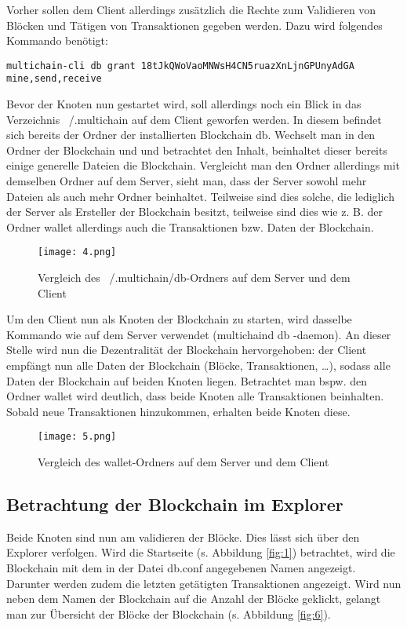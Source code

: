 Vorher sollen dem Client allerdings zusätzlich die Rechte zum Validieren von Blöcken und Tätigen von Transaktionen gegeben werden. Dazu wird folgendes Kommando benötigt:

\begin{lstlisting}[frame=single]
multichain-cli db grant 18tJkQWoVaoMNWsH4CN5ruazXnLjnGPUnyAdGA mine,send,receive
\end{lstlisting} 

Bevor der Knoten nun gestartet wird, soll allerdings noch ein Blick in das Verzeichnis ~/.multichain auf dem Client geworfen werden. In diesem befindet sich bereits der Ordner der installierten Blockchain db. Wechselt man in den Ordner der Blockchain und und betrachtet den Inhalt, beinhaltet dieser bereits einige generelle Dateien die Blockchain. Vergleicht man den Ordner allerdings mit demselben Ordner auf dem Server, sieht man, dass der Server sowohl mehr Dateien als auch mehr Ordner beinhaltet. Teilweise sind dies solche, die lediglich der Server als Ersteller der Blockchain besitzt, teilweise sind dies wie z. B. der Ordner wallet allerdings auch die Transaktionen bzw. Daten der Blockchain. 

\begin{figure}[h]
	\texttt{[image: 4.png]}
	\caption{Vergleich des ~/.multichain/db-Ordners auf dem Server und dem Client}
	\label{fig:4}
\end{figure}

Um den Client nun als Knoten der Blockchain zu starten, wird dasselbe Kommando wie auf dem Server verwendet (multichaind db -daemon). An dieser Stelle wird nun die Dezentralität der Blockchain hervorgehoben: der Client empfängt nun alle Daten der Blockchain (Blöcke, Transaktionen, …), sodass alle Daten der Blockchain auf beiden Knoten liegen. Betrachtet man bspw. den Ordner wallet wird deutlich, dass beide Knoten alle Transaktionen beinhalten. Sobald neue Transaktionen hinzukommen, erhalten beide Knoten diese.

\begin{figure}[h]
	\texttt{[image: 5.png]}
	\caption{Vergleich des wallet-Ordners auf dem Server und dem Client}
	\label{fig:5}
\end{figure}

\subsection{Betrachtung der Blockchain im Explorer}
Beide Knoten sind nun am validieren der Blöcke. Dies lässt sich über den Explorer verfolgen. Wird die Startseite (s. Abbildung \ref{fig:1}) betrachtet, wird die Blockchain mit dem in der Datei db.conf angegebenen Namen angezeigt. Darunter werden zudem die letzten getätigten Transaktionen angezeigt. Wird nun neben dem Namen der Blockchain auf die Anzahl der Blöcke geklickt, gelangt man zur Übersicht der Blöcke der Blockchain (s. Abbildung \ref{fig:6}).

